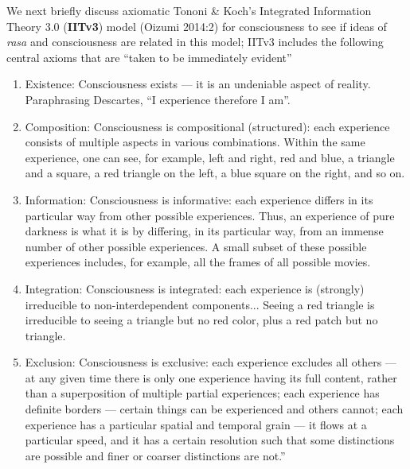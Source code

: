 We next briefly discuss axiomatic Tononi \& Koch’s Integrated Information Theory 3.0 (\textbf{IITv3}) model (Oizumi 2014:2) for consciousness to see if ideas of \textsl{rasa} and consciousness are related in this model; IITv3 includes the following central axioms that are “taken to be immediately evident”
\begin{enumerate}
\itemsep=0pt
\renewcommand{\labelenumi}{\theenumi:}
\item Existence: Consciousness exists --- it is an undeniable aspect of reality. Paraphrasing Descartes, “I experience therefore I am”. 
\item Composition: Consciousness is compositional (structured): each experience consists of multiple aspects in various combinations. Within the same experience, one can see, for example, left and right, red and blue, a triangle and a square, a red triangle on the left, a blue square on the right, and so on.
\item Information: Consciousness is informative: each experience differs in its particular way from other possible experiences. Thus, an experience of pure darkness is what it is by differing, in its particular way, from an immense number of other possible experiences. A small subset of these possible experiences includes, for example, all the frames of all possible movies.
\item Integration: Consciousness is integrated: each experience is (strongly) irreducible to non-interdependent components... Seeing a red triangle is irreducible to seeing a triangle but no red color, plus a red patch but no triangle.
\item Exclusion: Consciousness is exclusive: each experience excludes all others --- at any given time there is only one experience having its full content, rather than a superposition of multiple partial experiences; each experience has definite borders --- certain things can be experienced and others cannot; each experience has a particular spatial and temporal grain --- it flows at a particular speed, and it has a certain resolution such that some distinctions are possible and finer or coarser distinctions are not.”
\end{enumerate}

